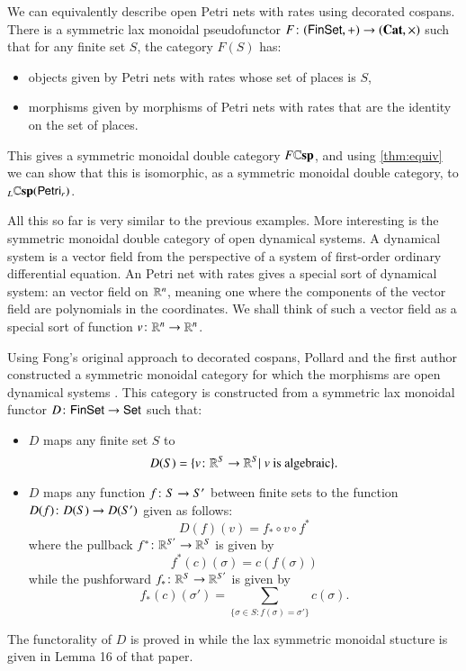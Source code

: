 \documentclass[reqno]{amsart}
\begin{document}
We can equivalently describe open Petri nets with rates using decorated cospans.  There is a symmetric lax monoidal pseudofunctor $F \colon (\mathsf{Fin}\mathsf{Set}, +) \to (\mathbf{Cat}, \times)$ such that for any finite set $S$, the category $F(S)$ has:
\begin{itemize}
\item objects given by Petri nets with rates whose set of places is $S$,
\item morphisms given by morphisms of Petri nets with rates that are the identity on the set of places.
\end{itemize}
This gives a symmetric monoidal double category $F \mathbf{\mathbb Csp}$, and using \cref{thm:equiv} we can show that this is isomorphic, as a symmetric monoidal double category, to ${}_L \mathbf{\mathbb Csp}(\mathsf{Petri}_r)$.

All this so far is very similar to the previous examples.  More interesting is the symmetric monoidal double category of open dynamical systems.   A dynamical system is a vector field from the perspective of a system of first-order ordinary differential equation.  An Petri net with rates gives a special sort of dynamical system: an  vector field on $\mathbb{R}^n$, meaning one where the components of the vector field are polynomials in the coordinates. We shall think of such a vector field as a special sort of function $v \colon \mathbb{R}^n \to \mathbb{R}^n$.

Using Fong's original approach to decorated cospans, Pollard and the first author constructed a symmetric monoidal category for which the morphisms are open dynamical systems \cite[Theorem 17]{BP}.  This category is constructed from a symmetric lax monoidal functor 
$D \colon \mathsf{Fin}\mathsf{Set} \to \mathsf{Set}$ such that:
\begin{itemize}
\item $D$ maps any finite set $S$ to 
\[ D(S) = \{ v \colon \mathbb{R}^S \to \mathbb{R}^S | \; v \textrm{ is algebraic}  \}. \]
\item $D$ maps any function $f \colon S \to S'$ between finite sets to the function $D(f) \colon D(S) \to D(S')$ given as follows:
\[ D(f)(v) = f_* \circ v \circ f^* \]
where the pullback $ f^* \colon \mathbb{R}^{S'} \to \mathbb{R}^S $ is given by
\[ f^*(c)(\sigma) = c(f(\sigma)) \] 
while the pushforward $ f_* \colon \mathbb{R}^{S} \to \mathbb{R}^{S'} $ is given by
\[ f_*(c)(\sigma') = \sum_{ \{ \sigma \in S : f(\sigma) = \sigma' \} } c(\sigma). \]
\end{itemize}
The functorality of $D$ is proved in \cite[Lemma 15]{BP} while the lax symmetric monoidal stucture is given in Lemma 16 of that paper.
\end{document}
